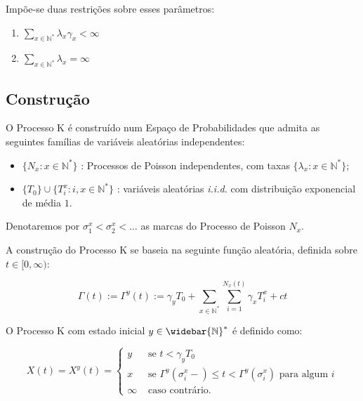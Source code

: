 \documentclass[xcolor=pdftex,dvipsnames]{beamer}
\newcommand{\Nz}{{\mathbb{N^*}}}
\newcommand{\Nzb}{{\mathbb{\widebar{N}^*}}}
\begin{document}
\begin{frame}

  Impõe-se duas restrições sobre esses parâmetros:
  \begin{block}{}
    \begin{enumerate}
    \item $ \displaystyle \sum_{x\in \Nz} \lambda_x \gamma_x <
      \infty $
      \bigskip
    \item $ \displaystyle \sum_{x\in \Nz} \lambda_x = \infty $
    \end{enumerate}
  \end{block}
\end{frame}

\subsection{Construção}

\begin{frame}

  O Processo K é construído num Espaço de Probabilidades que admita as
  seguintes famílias de variáveis aleatórias independentes:

  \begin{itemize}
  \item $\{ N_x: x \in \Nz\}$ : Processos de Poisson independentes,
    com taxas $\{ \lambda_x : x \in \Nz \}$;
  \item $\{T_0\} \cup \{ T_i^x: i, x \in \Nz  \}$ : variáveis aleatórias
    \emph{i.i.d.} com distribuição exponencial de média $1$.
  \end{itemize}

  Denotaremos por $\sigma^x_1 < \sigma^x_2 < \ldots$ as marcas do
  Processo de Poisson $N_x$.
  
\end{frame}

\begin{frame}

  A construção do Processo K se baseia na seguinte função aleatória,
  definida sobre $t \in [0, \infty)$:

  \begin{displaymath}
    \Gamma(t) := \Gamma^y(t) := \gamma_y T_0 + \sum_{x \in \Nz} \sum_{i = 1}^{N_x (t)}
    \gamma_x T^x_i + c t
  \end{displaymath}
\end{frame}

\begin{frame}
  
  O Processo K com estado inicial $y \in \Nzb$ é definido como:

  \begin{displaymath}
    X(t) = X^y (t) =
    \begin{cases}
      y & \textrm{ se }  t < \gamma_y T_0\\
      x & \textrm{ se } \Gamma^y(\sigma_i^x-) \leq t <
      \Gamma^y(\sigma^x_i)
      \textrm{ para algum } i \\
      \infty & \textrm{ caso contrário.}
    \end{cases}
  \end{displaymath}
\end{frame}
\end{document}
